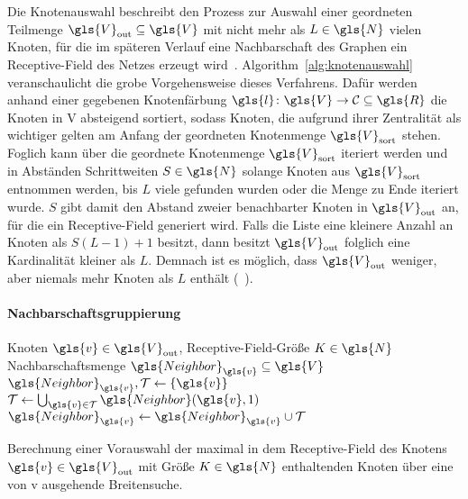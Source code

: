 Die Knotenauswahl beschreibt den Prozess zur Auswahl einer geordneten Teilmenge $\gls{V}_{\mathrm{out}} \subseteq \gls{V}$ mit nicht mehr als $L \in \gls{N}$ vielen Knoten, für die im späteren Verlauf eine Nachbarschaft des Graphen \bzw{} ein Receptive-Field des Netzes erzeugt wird~\cite{patchy}.
Algorithm~\ref{alg:knotenauswahl} veranschaulicht die grobe Vorgehensweise dieses Verfahrens.
Dafür werden anhand einer gegebenen Knotenfärbung $\gls{l} \colon \gls{V} \to \mathcal{C} \subseteq \gls{R}$ die Knoten in \gls{V} absteigend sortiert, sodass Knoten, die aufgrund ihrer Zentralität als wichtiger gelten am Anfang der geordneten Knotenmenge $\gls{V}_{\mathrm{sort}}$ stehen.
Foglich kann über die geordnete Knotenmenge $\gls{V}_{\mathrm{sort}}$ iteriert werden und in Abständen \bzw{} Schrittweiten $S \in \gls{N}$ solange Knoten aus $\gls{V}_{\mathrm{sort}}$ entnommen werden, bis $L$ viele gefunden wurden oder die Menge zu Ende iteriert wurde.
$S$ gibt damit den Abstand zweier benachbarter Knoten in $\gls{V}_{\mathrm{out}}$ an, für die ein Receptive-Field generiert wird.
Falls die Liste eine kleinere Anzahl an Knoten als $S\left( L -1 \right) + 1$ besitzt, dann besitzt $\gls{V}_{\mathrm{out}}$ folglich eine Kardinalität kleiner als $L$.
Demnach ist es möglich, dass $\gls{V}_{\mathrm{out}}$ weniger, aber niemals mehr Knoten als $L$ enthält (\vgl{}~\cite{patchy}).

\paragraph{Nachbarschaftsgruppierung}
\label{nachbarschaftsgruppierung}

\begin{algorithm}[t]
\centering
\begin{algorithmic}
  \REQUIRE{} Knoten $\gls{v} \in \gls{V}_{\mathrm{out}}$, Receptive-Field-Größe $K \in \gls{N}$
  \ENSURE{} Nachbarschaftsmenge $\gls{Neighbor}_{\gls{v}} \subseteq \gls{V}$
  \STATE{} $\gls{Neighbor}_{\gls{v}}, \mathcal{T} \leftarrow \left\{\gls{v}\right\}$
    \STATE{} $\mathcal{T} \leftarrow \bigcup_{\gls{v} \in \mathcal{T}} \gls{Neighbor}\left(\gls{v}, 1\right)$
    \STATE{} $\gls{Neighbor}_{\gls{v}} \leftarrow \gls{Neighbor}_{\gls{v}} \cup \mathcal{T}$
  \ENDWHILE{}
\end{algorithmic}
\caption[Nachbarschaftsgruppierung]{Berechnung einer Vorauswahl der maximal in dem Receptive-Field des Knotens $\gls{v} \in \gls{V}_{\mathrm{out}}$ mit Größe $K \in \gls{N}$ enthaltenden Knoten über eine von \gls{v} ausgehende Breitensuche.}
\label{alg:nachbarschaftsgruppierung}
\end{algorithm}


